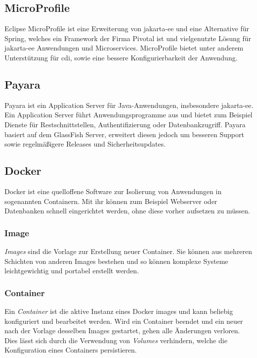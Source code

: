 \documentclass[12pt,twoside,a4paper]{article}
\begin{document}
\subsection{MicroProfile}\label{sec:microprofile}
Eclipse MicroProfile ist eine Erweiterung von \acrshort{jakarta-ee} und eine Alternative für Spring, welches ein Framework der Firma Pivotal ist und vielgenutzte Lösung für \acrshort{jakarta-ee} Anwendungen und Microservices.\newline
MicroProfile bietet unter anderem Unterstützung für \acrfull{cdi}, sowie eine bessere Konfigurierbarkeit der Anwendung.\newline\cite{microprofile}
\subsection{Payara}
Payara ist ein Application Server für Java-Anwendungen, insbesondere \acrshort{jakarta-ee}. Ein Application Server führt Anwendungsprogramme aus und bietet zum Beispiel Dienste für Restschnittstellen, Authentifizierung oder Datenbankzugriff. \cite{app-server}\newline
Payara basiert auf dem GlassFish Server, erweitert diesen jedoch um besseren Support sowie regelmäßigere Releases und Sicherheitsupdates.\newline\cite{payara-vs-glassfish}
\subsection{Docker}
Docker ist eine quelloffene Software zur Isolierung von Anwendungen in sogenannten Containern. Mit ihr können zum Beispiel Webserver oder Datenbanken schnell eingerichtet werden, ohne diese vorher aufsetzen zu müssen.
\subsubsection{Image}
\textit{Images} sind die Vorlage zur Erstellung neuer Container. Sie können aus mehreren Schichten von anderen Images bestehen und so können komplexe Systeme leichtgewichtig und portabel erstellt werden.
\subsubsection{Container}
Ein \textit{Container} ist die aktive Instanz eines Docker images und kann beliebig konfiguriert und bearbeitet werden. Wird ein Container beendet und ein neuer nach der Vorlage desselben Images gestartet, gehen alle Änderungen verloren. Dies lässt sich durch die Verwendung von \textit{Volumes} verhindern, welche die Konfiguration eines Containers persistieren.
\end{document}
